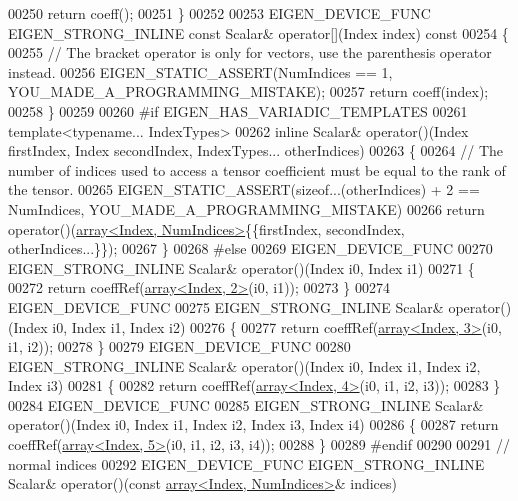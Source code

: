 \begin{DoxyCode}
00250       \textcolor{keywordflow}{return} coeff();
00251     \}
00252 
00253     EIGEN\_DEVICE\_FUNC EIGEN\_STRONG\_INLINE \textcolor{keyword}{const} Scalar& operator[](Index index)\textcolor{keyword}{ const}
00254 \textcolor{keyword}{    }\{
00255       \textcolor{comment}{// The bracket operator is only for vectors, use the parenthesis operator instead.}
00256       EIGEN\_STATIC\_ASSERT(NumIndices == 1, YOU\_MADE\_A\_PROGRAMMING\_MISTAKE);
00257       \textcolor{keywordflow}{return} coeff(index);
00258     \}
00259 
00260 \textcolor{preprocessor}{#if EIGEN\_HAS\_VARIADIC\_TEMPLATES}
00261     \textcolor{keyword}{template}<\textcolor{keyword}{typename}... IndexTypes>
00262     \textcolor{keyword}{inline} Scalar& operator()(Index firstIndex, Index secondIndex, IndexTypes... otherIndices)
00263     \{
00264       \textcolor{comment}{// The number of indices used to access a tensor coefficient must be equal to the rank of the tensor.}
00265       EIGEN\_STATIC\_ASSERT(\textcolor{keyword}{sizeof}...(otherIndices) + 2 == NumIndices, YOU\_MADE\_A\_PROGRAMMING\_MISTAKE)
00266       \textcolor{keywordflow}{return} operator()(\hyperlink{class_eigen_1_1array}{array<Index, NumIndices>}\{\{firstIndex, secondIndex, 
      otherIndices...\}\});
00267     \}
00268 \textcolor{preprocessor}{#else}
00269     EIGEN\_DEVICE\_FUNC
00270     EIGEN\_STRONG\_INLINE Scalar& operator()(Index i0, Index i1)
00271     \{
00272       \textcolor{keywordflow}{return} coeffRef(\hyperlink{class_eigen_1_1array}{array<Index, 2>}(i0, i1));
00273     \}
00274     EIGEN\_DEVICE\_FUNC
00275     EIGEN\_STRONG\_INLINE Scalar& operator()(Index i0, Index i1, Index i2)
00276     \{
00277       \textcolor{keywordflow}{return} coeffRef(\hyperlink{class_eigen_1_1array}{array<Index, 3>}(i0, i1, i2));
00278     \}
00279     EIGEN\_DEVICE\_FUNC
00280     EIGEN\_STRONG\_INLINE Scalar& operator()(Index i0, Index i1, Index i2, Index i3)
00281     \{
00282       \textcolor{keywordflow}{return} coeffRef(\hyperlink{class_eigen_1_1array}{array<Index, 4>}(i0, i1, i2, i3));
00283     \}
00284     EIGEN\_DEVICE\_FUNC
00285     EIGEN\_STRONG\_INLINE Scalar& operator()(Index i0, Index i1, Index i2, Index i3, Index i4)
00286     \{
00287       \textcolor{keywordflow}{return} coeffRef(\hyperlink{class_eigen_1_1array}{array<Index, 5>}(i0, i1, i2, i3, i4));
00288     \}
00289 \textcolor{preprocessor}{#endif}
00290 
00291     \textcolor{comment}{// normal indices}
00292     EIGEN\_DEVICE\_FUNC EIGEN\_STRONG\_INLINE Scalar& operator()(\textcolor{keyword}{const} 
      \hyperlink{class_eigen_1_1array}{array<Index, NumIndices>}& indices)

\end{DoxyCode}

